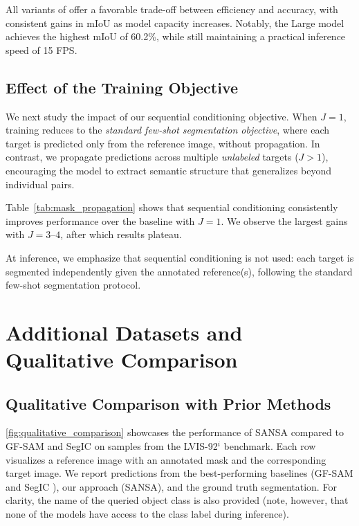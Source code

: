 

All variants of \ours{} offer a favorable trade-off between efficiency and accuracy, with consistent gains in mIoU as model capacity increases. Notably, the Large model achieves the highest mIoU of 60.2\%, while still maintaining a practical inference speed of 15 FPS.

\subsection{Effect of the Training Objective}
\label{sec:loss_ablation}
We next study the impact of our sequential conditioning objective. 
When $J=1$, training reduces to the \textit{standard few-shot segmentation objective}, where each target is predicted only from the reference image, without propagation. In contrast, we propagate predictions across multiple \textit{unlabeled} targets ($J>1$), encouraging the model to extract semantic structure that generalizes beyond individual pairs.

Table~\ref{tab:mask_propagation} shows that sequential conditioning consistently improves performance over the baseline with $J=1$. 
We observe the largest gains with $J=3$--$4$, after which results plateau.



At inference, we emphasize that sequential conditioning is not used: each target is segmented independently given the annotated reference(s), following the standard few-shot segmentation protocol.



\section{Additional Datasets and Qualitative Comparison}
\label{sec:supp_qualitative}
\subsection{Qualitative Comparison with Prior Methods}
\cref{fig:qualitative_comparison} showcases the performance of SANSA compared to GF-SAM \cite{zhang2024bridge} and SegIC \cite{meng2024segic} on samples from the LVIS-92$^i$ benchmark. Each row visualizes a reference image with an annotated mask and the corresponding target image. We report predictions from the best-performing baselines (GF-SAM \cite{zhang2024bridge} and SegIC \cite{meng2024segic}), our approach (SANSA), and the ground truth segmentation. For clarity, the name of the queried object class is also provided (note, however, that none of the models have access to the class label during inference).

